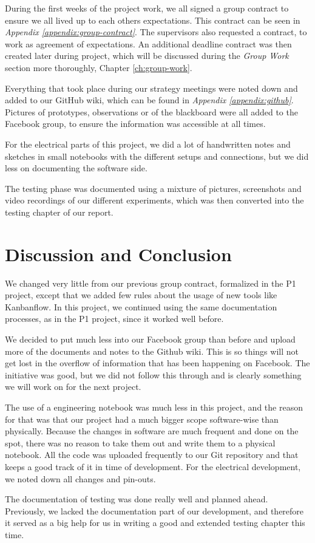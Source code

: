 During the first weeks of the project work, we all signed a group contract to ensure we all lived up to each others expectations. This contract can be seen in \textit{Appendix \ref{appendix:group-contract}}. The supervisors also requested a contract, to work as agreement of expectations. An additional deadline contract was then created later during project, which will be discussed during the \textit{Group Work} section more thoroughly, Chapter \ref{ch:group-work}.

Everything that took place during our strategy meetings were noted down and added to our GitHub wiki, which can be found in \textit{Appendix \ref{appendix:github}}. Pictures of prototypes, observations or of the blackboard were all added to the Facebook group, to ensure the information was accessible at all times.

For the electrical parts of this project, we did a lot of handwritten notes and sketches in small notebooks with the different setups and connections, but we did less on documenting the software side.

The testing phase was documented using a mixture of pictures, screenshots and video recordings of our different experiments, which was then converted into the testing chapter of our report. 

\section{Discussion and Conclusion}

We changed very little from our previous group contract, formalized in the P1 project, except that we added few rules about the usage of new tools like Kanbanflow. In this project, we continued using the same documentation processes, as in the P1 project, since it worked well before. 

We decided to put much less into our Facebook group than before and upload more of the documents and notes to the Github wiki. This is so things will not get lost in the overflow of information that has been happening on Facebook. The initiative was good, but we did not follow this through and is clearly something we will work on for the next project.

The use of a engineering notebook was much less in this project, and the reason for that was that our project had a much bigger scope software-wise than physically. Because the changes in software are much frequent and done on the spot, there was no reason to take them out and write them to a physical notebook. All the code was uploaded frequently to our Git repository and that keeps a good track of it in time of development. For the electrical development, we noted down all changes and pin-outs.

The documentation of testing was done really well and planned ahead. Previously, we lacked the documentation part of our development, and therefore it served as a big help for us in writing a good and extended testing chapter this time.